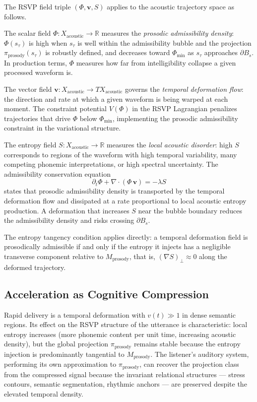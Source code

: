 \documentclass[12pt, a4paper]{article}
\theoremstyle{essaystyle}
\begin{document}
The RSVP field triple $(\Phi, \mathbf{v}, S)$ applies to the acoustic trajectory
space as follows.

The scalar field $\Phi : X_{\mathrm{acoustic}} \to \mathbb{R}$ measures the
\emph{prosodic admissibility density}: $\Phi(s_\tau)$ is high when $s_\tau$ is well
within the admissibility bubble and the projection $\pi_{\mathrm{prosody}}(s_\tau)$
is robustly defined, and decreases toward $\Phi_{\min}$ as $s_\tau$ approaches
$\partial B_s$. In production terms, $\Phi$ measures how far from intelligibility
collapse a given processed waveform is.

The vector field $\mathbf{v} : X_{\mathrm{acoustic}} \to TX_{\mathrm{acoustic}}$
governs the \emph{temporal deformation flow}: the direction and rate at which a given
waveform is being warped at each moment. The constraint potential $V(\Phi)$ in the
RSVP Lagrangian penalizes trajectories that drive $\Phi$ below $\Phi_{\min}$,
implementing the prosodic admissibility constraint in the variational structure.

The entropy field $S : X_{\mathrm{acoustic}} \to \mathbb{R}$ measures the
\emph{local acoustic disorder}: high $S$ corresponds to regions of the waveform with
high temporal variability, many competing phonemic interpretations, or high spectral
uncertainty. The admissibility conservation equation
\[
\partial_t \Phi + \nabla \cdot (\Phi\,\mathbf{v}) = -\lambda S
\]
states that prosodic admissibility density is transported by the temporal deformation
flow and dissipated at a rate proportional to local acoustic entropy production.
A deformation that increases $S$ near the bubble boundary reduces the admissibility
density and risks crossing $\partial B_s$.

The entropy tangency condition applies directly: a temporal deformation field is
prosodically admissible if and only if the entropy it injects has a negligible
transverse component relative to $M_{\mathrm{prosody}}$, that is,
$(\nabla S)_\perp \approx 0$ along the deformed trajectory.

\subsection{Acceleration as Cognitive Compression}

Rapid delivery is a temporal deformation with $v(t) \gg 1$ in dense semantic regions.
Its effect on the RSVP structure of the utterance is characteristic: local entropy
increases (more phonemic content per unit time, increasing acoustic density), but
the global projection $\pi_{\mathrm{prosody}}$ remains stable because the entropy
injection is predominantly tangential to $M_{\mathrm{prosody}}$. The listener's
auditory system, performing its own approximation to $\pi_{\mathrm{prosody}}$,
can recover the projection class from the compressed signal because the invariant
relational structures --- stress contours, semantic segmentation, rhythmic anchors ---
are preserved despite the elevated temporal density.
\end{document}
